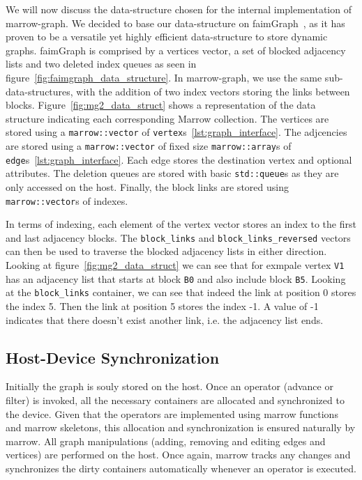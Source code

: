 We will now discuss the data-structure chosen for the internal implementation of marrow-graph. We decided to base our data-structure on faimGraph~\cite{paper:faimgraph}, as it has proven to be a versatile yet highly efficient data-structure to store dynamic graphs. faimGraph is comprised by a vertices vector, a set of blocked adjacency lists and two deleted index queues as seen in figure~\ref{fig:faimgraph_data_structure}. In marrow-graph, we use the same sub-data-structures, with the addition of two index vectors storing the links between blocks. Figure~\ref{fig:mg2_data_struct} shows a representation of the data structure indicating each corresponding Marrow collection.  The vertices are stored using a \texttt{marrow::vector} of \texttt{vertex}s~\ref{lst:graph_interface}. The adjcencies are stored using a \texttt{marrow::vector} of fixed size \texttt{marrow::array}s of \texttt{edge}s~\ref{lst:graph_interface}. Each edge stores the destination vertex and optional attributes. The deletion queues are stored with basic \texttt{std::queue}s as they are only accessed on the host. Finally, the block links are stored using \texttt{marrow::vector}s of indexes. 

In terms of indexing, each element of the vertex vector stores an index to the first and last adjacency blocks. The \texttt{block\_links} and \texttt{block\_links\_reversed} vectors can then be used to traverse the blocked adjacency lists in either direction. Looking at figure~\ref{fig:mg2_data_struct} we can see that for exmpale vertex \texttt{V1} has an adjacency list that starts at block \texttt{B0} and also include block \texttt{B5}. Looking at the \texttt{block\_links} container, we can see that indeed the link at position 0 stores the index 5. Then the link at position 5 stores the index -1. A value of -1 indicates that there doesn't exist another link, i.e. the adjacency list ends.

\subsection{Host-Device Synchronization}

Initially the graph is souly stored on the host. Once an operator (advance or filter) is invoked, all the necessary containers are allocated and synchronized to the device. Given that the operators are implemented using marrow functions and marrow skeletons, this allocation and synchronization is ensured naturally by marrow. All graph manipulations (adding, removing and editing edges and vertices) are performed on the host. Once again, marrow tracks any changes and synchronizes the dirty containers automatically whenever an operator is executed.

